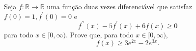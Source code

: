 Seja \(f\colon \mathbb{R}\to \mathbb{R}\) uma função duas vezes diferenciável que satisfaz \(f(0)=1, f^{\prime}(0)=0\) e
\[ f^{\prime \prime}(x)-5f^{\prime}(x)+6f(x)\ge 0 \]
para todo \(x\in [0,\infty)\).
Prove que, para todo \(x\in [0,\infty)\),
\[ f(x)\ge 3e^{2x}-2e^{3x}. \]
